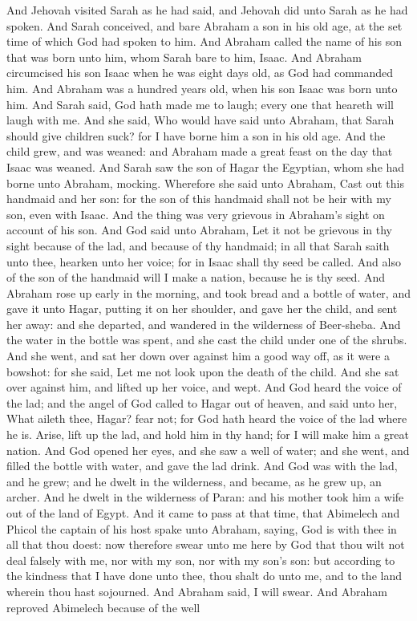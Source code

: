 And Jehovah visited Sarah as he had said, and Jehovah did unto Sarah as he had spoken. And Sarah conceived, and bare Abraham a son in his old age, at the set time of which God had spoken to him. And Abraham called the name of his son that was born unto him, whom Sarah bare to him, Isaac. And Abraham circumcised his son Isaac when he was eight days old, as God had commanded him. And Abraham was a hundred years old, when his son Isaac was born unto him. And Sarah said, God hath made me to laugh; every one that heareth will laugh with me. And she said, Who would have said unto Abraham, that Sarah should give children suck? for I have borne him a son in his old age.  And the child grew, and was weaned: and Abraham made a great feast on the day that Isaac was weaned. And Sarah saw the son of Hagar the Egyptian, whom she had borne unto Abraham, mocking. Wherefore she said unto Abraham, Cast out this handmaid and her son: for the son of this handmaid shall not be heir with my son, even with Isaac. And the thing was very grievous in Abraham’s sight on account of his son. And God said unto Abraham, Let it not be grievous in thy sight because of the lad, and because of thy handmaid; in all that Sarah saith unto thee, hearken unto her voice; for in Isaac shall thy seed be called. And also of the son of the handmaid will I make a nation, because he is thy seed. And Abraham rose up early in the morning, and took bread and a bottle of water, and gave it unto Hagar, putting it on her shoulder, and gave her the child, and sent her away: and she departed, and wandered in the wilderness of Beer-sheba. And the water in the bottle was spent, and she cast the child under one of the shrubs. And she went, and sat her down over against him a good way off, as it were a bowshot: for she said, Let me not look upon the death of the child. And she sat over against him, and lifted up her voice, and wept. And God heard the voice of the lad; and the angel of God called to Hagar out of heaven, and said unto her, What aileth thee, Hagar? fear not; for God hath heard the voice of the lad where he is. Arise, lift up the lad, and hold him in thy hand; for I will make him a great nation. And God opened her eyes, and she saw a well of water; and she went, and filled the bottle with water, and gave the lad drink. And God was with the lad, and he grew; and he dwelt in the wilderness, and became, as he grew up, an archer. And he dwelt in the wilderness of Paran: and his mother took him a wife out of the land of Egypt.  And it came to pass at that time, that Abimelech and Phicol the captain of his host spake unto Abraham, saying, God is with thee in all that thou doest: now therefore swear unto me here by God that thou wilt not deal falsely with me, nor with my son, nor with my son’s son: but according to the kindness that I have done unto thee, thou shalt do unto me, and to the land wherein thou hast sojourned. And Abraham said, I will swear. And Abraham reproved Abimelech because of the well 